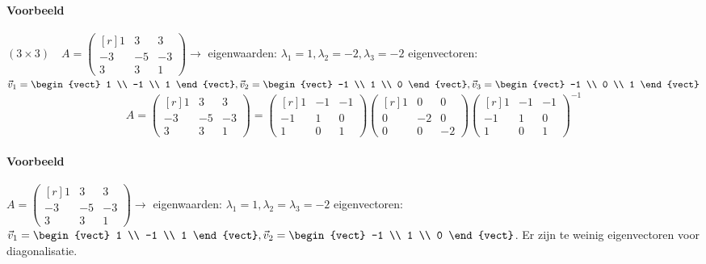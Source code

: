 \paragraph{Voorbeeld} $(3 \times 3 ) \quad A = \begin{pmatrix*}[r] 1 & 3 & 3 \\ -3 & -5 & -3 \\ 3 & 3 & 1 \end{pmatrix*} \to$ eigenwaarden: $\lambda_1 = 1, \lambda_2 = -2, \lambda_3 = -2$ eigenvectoren: $\vec{v}_1 = \begin{vect} 1 \\ -1 \\ 1 \end{vect}, \vec{v}_2 = \begin{vect} -1 \\ 1 \\ 0 \end{vect}, \vec{v}_3 = \begin{vect} -1 \\ 0 \\ 1 \end{vect}$
\[ A = \begin{pmatrix*}[r] 1 & 3 & 3 \\ -3 & -5 & -3 \\ 3 & 3 & 1 \end{pmatrix*} = \begin{pmatrix*}[r] 1 & -1 & -1 \\ -1 & 1 & 0 \\ 1 & 0 & 1 \end{pmatrix*} \begin{pmatrix*}[r] 1 & 0 & 0 \\ 0 & -2 & 0 \\ 0 & 0 & -2 \end{pmatrix*} \begin{pmatrix*}[r] 1 & -1 & -1 \\ -1 & 1 & 0 \\ 1 & 0 & 1 \end{pmatrix*}^{-1} \]

\paragraph{Voorbeeld} $A = \begin{pmatrix*}[r] 1 & 3 & 3 \\ -3 & -5 & -3 \\ 3 & 3 & 1 \end{pmatrix*} \to$ eigenwaarden: $\lambda_1 =1, \lambda_2 = \lambda_3 = -2$ eigenvectoren: $\vec{v}_1 = \begin{vect} 1 \\ -1 \\ 1 \end{vect}, \vec{v}_2 = \begin{vect} -1 \\ 1 \\ 0 \end{vect}$. Er zijn te weinig eigenvectoren voor diagonalisatie.

